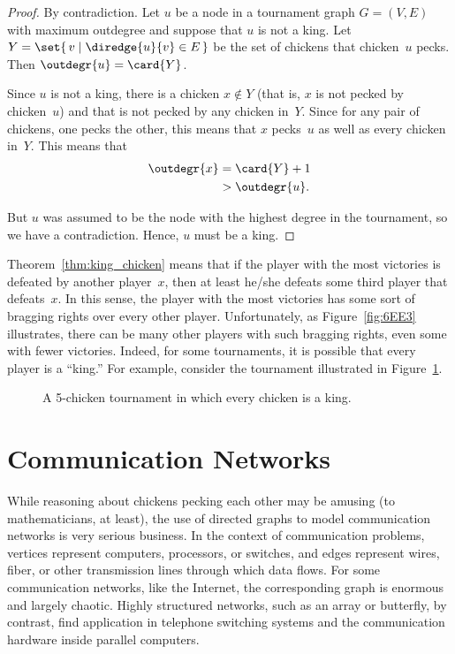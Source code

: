 \begin{proof}
By contradiction.  Let $u$ be a node in a tournament graph $G = (V,
E)$ with maximum outdegree and suppose that $u$ is not a king.  Let $Y
= \set{\, v \mid \diredge{u}{v} \in E \,}$ be the set of chickens that
chicken~$u$ pecks.  Then $\outdegr{u} = \card{Y}$.

Since $u$ is not a king, there is a chicken $x \notin Y$ (that is, $x$
is not pecked by chicken~$u$) and that is not pecked by any chicken
in~$Y$.  Since for any pair of chickens, one pecks the other, this
means that $x$ pecks~$u$ as well as every chicken in~$Y$.  This means
that
\begin{align*}
    \outdegr{x} &= \card{Y} + 1 \\
                &> \outdegr{u}.
\end{align*}

But $u$ was assumed to be the node with the highest degree in the
tournament, so we have a contradiction.  Hence, $u$ must be a king.
\end{proof}

Theorem~\ref{thm:king_chicken} means that if the player with the most
victories is defeated by another player~$x$, then at least he/she
defeats some third player that defeats~$x$.  In this sense, the player
with the most victories has some sort of bragging rights over every
other player.  Unfortunately, as Figure~\ref{fig:6EE3} illustrates,
there can be many other players with such bragging rights, even some
with fewer victories.  Indeed, for some tournaments, it is possible
that every player is a ``king.''  For example, consider the tournament
illustrated in Figure~\ref{fig:6EE4}.

\begin{figure}

\missinggraphic

\caption{A 5-chicken tournament in which every chicken is a king.}

\label{fig:6EE4}

\end{figure}

\section{Communication
  Networks}\label{comm_net_sec}\label{chap:comm_nets}

While reasoning about chickens pecking each other may be amusing (to
mathematicians, at least), the use of directed graphs to model
communication networks is very serious business.  In the context of
communication problems, vertices represent computers, processors, or
switches, and edges represent wires, fiber, or other transmission
lines through which data flows.  For some communication networks, like
the Internet, the corresponding graph is enormous and largely chaotic.
Highly structured networks, such as an array or butterfly, by
contrast, find application in telephone switching systems and the
communication hardware inside parallel computers.

